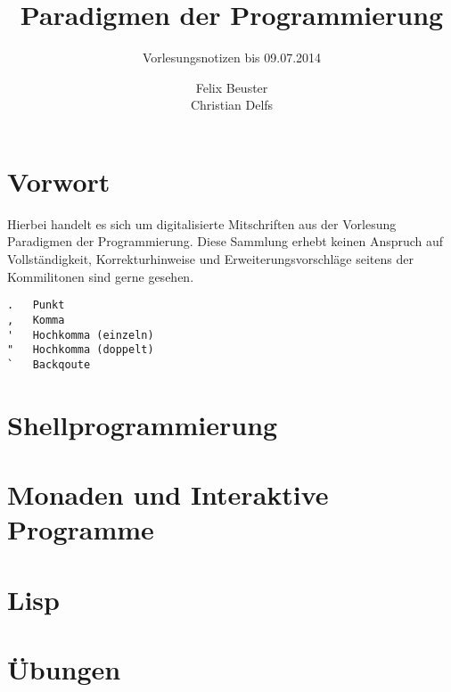 \documentclass[11pt,a4paper]{scrartcl}
\title{Paradigmen der Programmierung}
\subtitle{Vorlesungsnotizen bis 09.07.2014}
\author{Felix Beuster\\Christian Delfs}
\date{}
\begin{document}
\setlength{\parindent}{0ex}
\maketitle
\newpage
\tableofcontents
\newpage

\section*{Vorwort} %
\label{sec:vorwort}

	Hierbei handelt es sich um digitalisierte Mitschriften aus der Vorlesung Paradigmen der
	Programmierung. Diese Sammlung erhebt keinen Anspruch auf Vollständigkeit, Korrekturhinweise
	und Erweiterungsvorschläge seitens der Kommilitonen sind gerne gesehen.

	\begin{lstlisting}
.   Punkt
,   Komma
'   Hochkomma (einzeln)
"   Hochkomma (doppelt)
`   Backqoute
	\end{lstlisting}


\section{Shellprogrammierung} %
\label{sec:shellprogrammierung}

\clearpage
\section{Monaden und Interaktive Programme} %
\label{sec:monaden_und_interaktive_programme}

\clearpage
\section{Lisp} %
\label{sec:lisp}





\clearpage
\appendix
\section{Übungen} %
\label{sec:uebungen}
\end{document}
